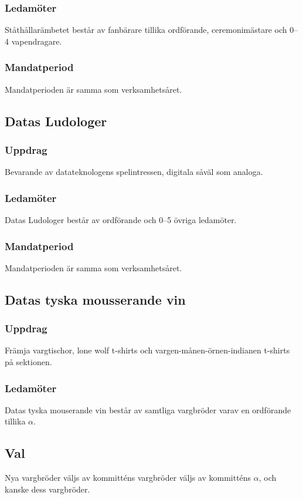\subsubsection{Ledamöter}
Ståthållarämbetet består av fanbärare tillika ordförande, ceremonimästare och 0--4 vapendragare.
\subsubsection{Mandatperiod}
Mandatperioden är samma som verksamhetsåret. 

\subsection{Datas Ludologer}
\subsubsection{Uppdrag}
Bevarande av datateknologens spelintressen, digitala såväl som analoga.
\subsubsection{Ledamöter}
Datas Ludologer består av ordförande och 0--5 övriga ledamöter.
\subsubsection{Mandatperiod}
Mandatperioden är samma som verksamhetsåret. 

\subsection{Datas tyska mousserande vin}
\subsubsection{Uppdrag}
Främja vargtischor, lone wolf t-shirts och vargen-månen-örnen-indianen t-shirts på sektionen.
\subsubsection{Ledamöter}
Datas tyska mouserande vin består av samtliga vargbröder varav en ordförande tillika $\alpha$. 
\subsection{Val}
Nya vargbröder väljs av kommitténs vargbröder väljs av kommitténs $\alpha$, och kanske dess vargbröder.
